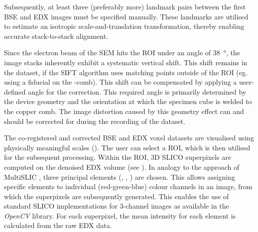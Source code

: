 Subsequently, at least three (preferably more) landmark pairs between the first \ac{BSE} and \ac{EDX} images must be specified manually.
These landmarks are utilised to estimate an isotropic scale-and-translation transformation, thereby enabling accurate stack-to-stack alignment.

Since the electron beam of the \ac{SEM} hits the \ac{ROI} under an angle of \qty{38}{\degree}, the image stacks inherently exhibit a systematic vertical shift.
This shift remains in the dataset, if the \ac{SIFT} algorithm uses matching points outside of the \ac{ROI} (eg. using a fiducial on the -comb).
This shift can be compensated by applying a user-defined angle for the correction.
This required angle is primarily determined by the device geometry and the orientation at which the specimen cube is welded to the copper comb.
The image distortion caused by this geometry effect can and should be corrected for during the recording of the dataset.

The co-registered and corrected \ac{BSE} and \ac{EDX} voxel datasets are visualised using physically meaningful scales ().
The user can select a \ac{ROI}, which is then utilised for the subsequent processing.
Within the \ac{ROI}, 3D \ac{SLIC}O superpixels are computed on the denoised \ac{EDX} volume (see ).
In analogy to the approach of Multi\ac{SLIC} \cite{yu.2023}, three principal elements (, , ) are chosen.
This allows assigning specific elements to individual (red-green-blue) colour channels in an image, from which the superpixels are subsequently generated.
This enables the use of standard \ac{SLIC}O implementations for 3-channel images as available in the \textit{OpenCV} \cite{bradski.2000} library.
For each superpixel, the mean intensity for each element is calculated from the raw \ac{EDX} data.

